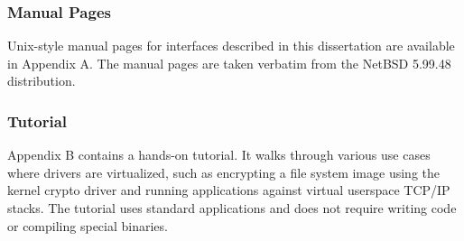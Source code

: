 \subsubsection{Manual Pages}

Unix-style manual pages for interfaces described in this dissertation
are available in Appendix A.  The manual pages are taken verbatim
from the NetBSD 5.99.48 distribution.

\subsubsection{Tutorial}

Appendix B contains a hands-on tutorial.  It walks through various
use cases where drivers are virtualized, such as encrypting a file
system image using the kernel crypto driver and running applications
against virtual userspace TCP/IP stacks.  The tutorial uses standard
applications and does not require writing code or compiling special
binaries.
